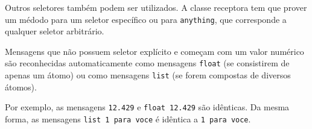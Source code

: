 Outros seletores também podem ser utilizados. A classe receptora tem que
prover um médodo para um seletor específico ou para \texttt{anything}, que
corresponde a qualquer seletor arbitrário.

Mensagens que não possuem seletor explícito e começam com um valor numérico
são reconhecidas automaticamente como mensagens \texttt{float} (se consistirem
de apenas um átomo) ou como mensagens \texttt{list} (se forem compostas de
diversos átomos).

Por exemplo, as mensagens \texttt{12.429} e \texttt{float 12.429} são
idênticas. Da mesma forma, as mensagens \texttt{list 1 para voce} é idêntica a
\texttt{1 para voce}.

